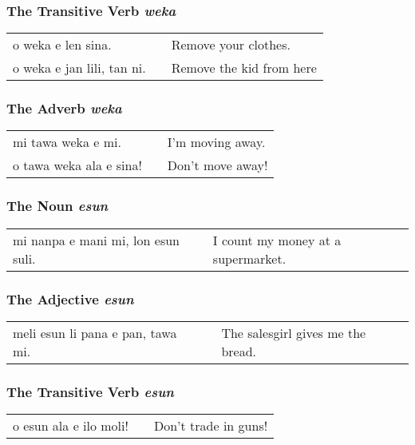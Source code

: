 \subsubsection*{The Transitive Verb \textit{weka}}
\begin{supertabular}{p{5,5cm}|ll}
    o weka e len sina.         &  & Remove your clothes.     \\
    o weka e jan lili, tan ni. &  & Remove the kid from here \\
\end{supertabular}

\subsubsection*{The Adverb \textit{weka}}
\begin{supertabular}{p{5,5cm}|ll}
    mi tawa weka e mi.      &  & I'm moving away. \\
    o tawa weka ala e sina! &  & Don't move away! \\
\end{supertabular}

\subsubsection*{The Noun \textit{esun}}
\begin{supertabular}{p{5,5cm}|ll}
    mi nanpa e mani mi, lon esun suli. &  & I count my money at a supermarket. \\
\end{supertabular}

\subsubsection*{The Adjective \textit{esun}}
\begin{supertabular}{p{5,5cm}|ll}
    meli esun li pana e pan, tawa mi. &  & The salesgirl gives me the bread. \\
\end{supertabular}

\subsubsection*{The Transitive Verb \textit{esun}}
\begin{supertabular}{p{5,5cm}|ll}
    o esun ala e ilo moli! &  & Don't trade in guns! \\
\end{supertabular}

